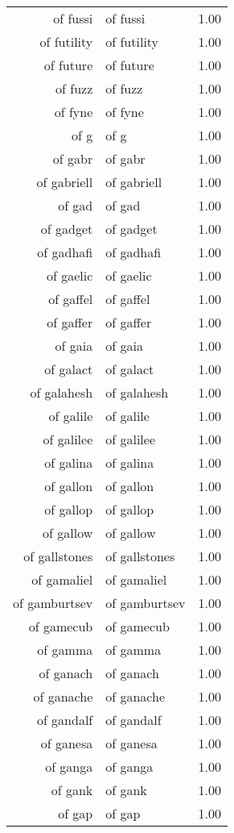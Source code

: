 \begin{table}[ht]
\begin{tabular}{rlr}
  of fussi & of fussi & 1.00 \\ 
  of futility & of futility & 1.00 \\ 
  of future & of future & 1.00 \\ 
  of fuzz & of fuzz & 1.00 \\ 
  of fyne & of fyne & 1.00 \\ 
  of g & of g & 1.00 \\ 
  of gabr & of gabr & 1.00 \\ 
  of gabriell & of gabriell & 1.00 \\ 
  of gad & of gad & 1.00 \\ 
  of gadget & of gadget & 1.00 \\ 
  of gadhafi & of gadhafi & 1.00 \\ 
  of gaelic & of gaelic & 1.00 \\ 
  of gaffel & of gaffel & 1.00 \\ 
  of gaffer & of gaffer & 1.00 \\ 
  of gaia & of gaia & 1.00 \\ 
  of galact & of galact & 1.00 \\ 
  of galahesh & of galahesh & 1.00 \\ 
  of galile & of galile & 1.00 \\ 
  of galilee & of galilee & 1.00 \\ 
  of galina & of galina & 1.00 \\ 
  of gallon & of gallon & 1.00 \\ 
  of gallop & of gallop & 1.00 \\ 
  of gallow & of gallow & 1.00 \\ 
  of gallstones & of gallstones & 1.00 \\ 
  of gamaliel & of gamaliel & 1.00 \\ 
  of gamburtsev & of gamburtsev & 1.00 \\ 
  of gamecub & of gamecub & 1.00 \\ 
  of gamma & of gamma & 1.00 \\ 
  of ganach & of ganach & 1.00 \\ 
  of ganache & of ganache & 1.00 \\ 
  of gandalf & of gandalf & 1.00 \\ 
  of ganesa & of ganesa & 1.00 \\ 
  of ganga & of ganga & 1.00 \\ 
  of gank & of gank & 1.00 \\ 
  of gap & of gap & 1.00 \\ 

\end{tabular}
\end{table}
